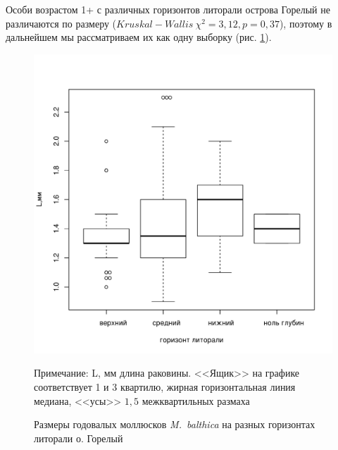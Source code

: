 Особи возрастом 1+ с различных горизонтов литорали острова Горелый не различаются по размеру ($Kruskal-Wallis\ \chi^2 = 3,12, p = 0,37$), поэтому в дальнейшем мы рассматриваем их как одну выборку (рис. \ref{ris:Goreliy_length1+_gorizonty}).
	\begin{figure}[hbp]
		\includegraphics{../White_Sea/growth_young/boxplot_Goreliy_length_1+_tidal.pdf}
	\caption{Размеры  годовалых моллюсков {\it M.~balthica} на разных горизонтах литорали о. Горелый}
	\label{ris:Goreliy_length1+_gorizonty}
	{\footnotesize Примечание: L, мм \textemdash длина раковины. <<Ящик>> на графике соответствует 1 и 3 квартилю, жирная горизонтальная линия \textemdash 		медиана, <<усы>> \textemdash $1,5$ межквартильных размаха}
	\end{figure}

